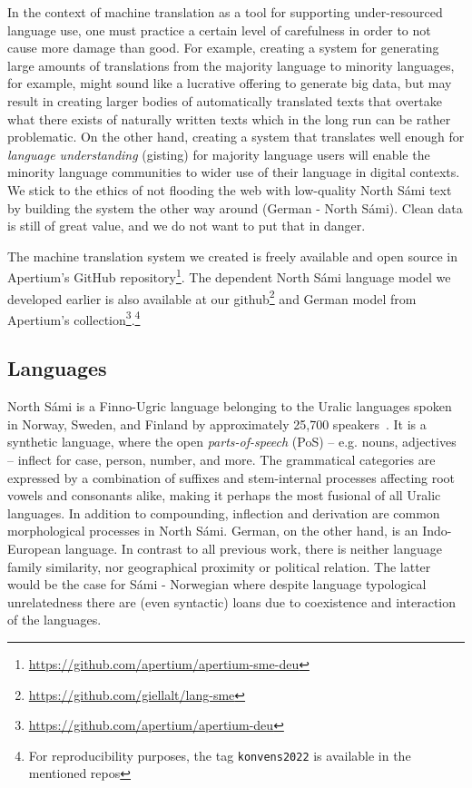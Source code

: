 \documentclass{flammie}
\begin{document}
In the context of machine translation as a tool for supporting under-resourced
language use, one must practice a certain level of carefulness in order to not
cause more damage than good.  For example, creating a system for generating
large amounts of translations from the majority language to minority languages,
for example, might sound like a lucrative offering to generate big data, but may
result in creating larger bodies of automatically translated texts that overtake
what there exists of naturally written texts which in the long run can be rather
problematic.  On the other hand, creating a system that translates well enough
for \textit{language understanding} (gisting) for majority language users will
enable the minority language communities to wider use of their language in
digital contexts.  We stick to the ethics of not flooding the web with
low-quality North Sámi text by building the system the other way around (German
- North Sámi). Clean data is still of great value, and we do not want to put
that in danger.

The machine translation system we created is freely available and open source in
Apertium's GitHub
repository\footnote{\url{https://github.com/apertium/apertium-sme-deu}}. The
dependent North Sámi language model we developed earlier is also available at
our github\footnote{\url{https://github.com/giellalt/lang-sme}} and German model
from Apertium's
collection\footnote{\url{https://github.com/apertium/apertium-deu}}.\footnote{For
reproducibility purposes, the tag \texttt{konvens2022} is available in the
mentioned repos}

\subsection{Languages}

North Sámi is a Finno-Ugric language belonging to the Uralic languages spoken in
Norway, Sweden, and Finland by approximately 25,700
speakers~\cite{Ethnologue2022}. It is a synthetic language, where the open
\textit{parts-of-speech} (PoS) -- e.g. nouns, adjectives -- inflect for case,
person, number, and more. The grammatical categories are expressed by a
combination of suffixes and stem-internal processes affecting root vowels and
consonants alike, making it perhaps the most fusional of all Uralic languages.
In addition to compounding, inflection and derivation are common morphological
processes in North Sámi.  German, on the other hand, is an Indo-European
language.  In contrast to all previous work, there is neither language family
similarity, nor geographical proximity or political relation. The latter would
be the case for Sámi - Norwegian where despite language typological
unrelatedness there are (even syntactic) loans due to coexistence and
interaction of the languages.
\end{document}
